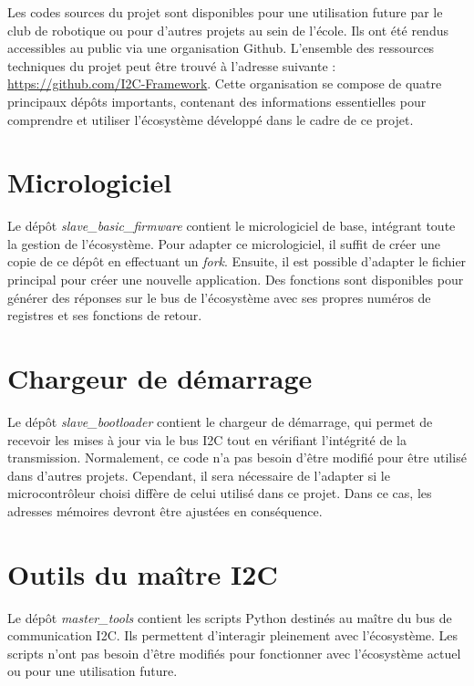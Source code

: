 Les codes sources du projet sont disponibles pour une utilisation future par le club de robotique ou pour d'autres projets au sein de l'école.
Ils ont été rendus accessibles au public via une organisation Github.
L'ensemble des ressources techniques du projet peut être trouvé à l'adresse suivante : \url{https://github.com/I2C-Framework}.
Cette organisation se compose de quatre principaux dépôts importants, contenant des informations essentielles pour comprendre et utiliser l'écosystème développé dans le cadre de ce projet.

\section{Micrologiciel}

Le dépôt \textit{slave_basic_firmware} contient le micrologiciel de base, intégrant toute la gestion de l'écosystème.
Pour adapter ce micrologiciel, il suffit de créer une copie de ce dépôt en effectuant un \textit{fork}.
Ensuite, il est possible d'adapter le fichier principal pour créer une nouvelle application.
Des fonctions sont disponibles pour générer des réponses sur le bus de l'écosystème avec ses propres numéros de registres et ses fonctions de retour.

\section{Chargeur de démarrage}

Le dépôt \textit{slave_bootloader} contient le chargeur de démarrage, qui permet de recevoir les mises à jour via le bus I2C tout en vérifiant l'intégrité de la transmission.
Normalement, ce code n'a pas besoin d'être modifié pour être utilisé dans d'autres projets.
Cependant, il sera nécessaire de l'adapter si le microcontrôleur choisi diffère de celui utilisé dans ce projet.
Dans ce cas, les adresses mémoires devront être ajustées en conséquence.

\section{Outils du maître I2C}

Le dépôt \textit{master_tools} contient les scripts Python destinés au maître du bus de communication I2C.
Ils permettent d'interagir pleinement avec l'écosystème.
Les scripts n'ont pas besoin d'être modifiés pour fonctionner avec l'écosystème actuel ou pour une utilisation future.